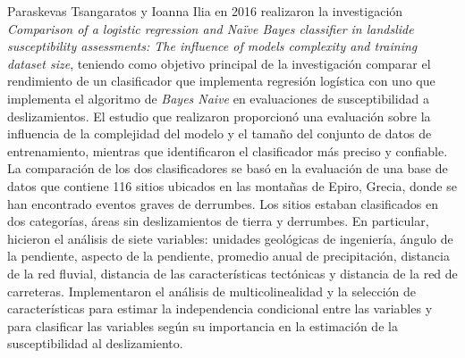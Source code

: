  Paraskevas Tsangaratos y Ioanna Ilia en 2016 realizaron la investigación  \textit{Comparison of a logistic regression and Naïve Bayes classifier in landslide susceptibility assessments: The influence of models complexity and training dataset size}, teniendo como objetivo principal de la investigación  comparar el rendimiento de un clasificador que implementa regresión logística con uno que implementa el algoritmo de \textit{Bayes Naive} en evaluaciones de susceptibilidad a deslizamientos. El estudio que realizaron proporcionó una evaluación sobre la influencia de la complejidad del modelo y el tamaño del conjunto de datos de entrenamiento, mientras que identificaron el clasificador más preciso y confiable. La comparación de los dos clasificadores se basó en la evaluación de una base de datos que contiene 116 sitios ubicados en las montañas de Epiro, Grecia, donde se han encontrado eventos graves de derrumbes. Los sitios estaban clasificados en dos categorías, áreas sin deslizamientos de tierra y derrumbes. En particular, hicieron el análisis de  siete variables: unidades geológicas de ingeniería, ángulo de la pendiente, aspecto de la pendiente, promedio anual de precipitación, distancia de la red fluvial, distancia de las características tectónicas y distancia de la red de carreteras. Implementaron el análisis de multicolinealidad y la selección de características para estimar la independencia condicional entre las variables y para clasificar las variables según su importancia en la estimación de la susceptibilidad al deslizamiento.\\

